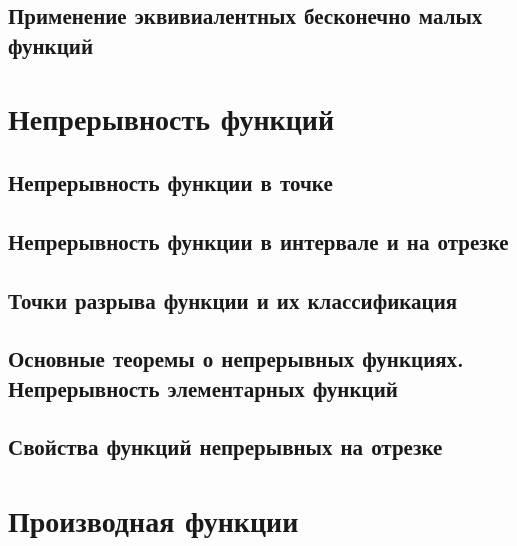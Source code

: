 \documentclass[14pt]{extreport}
\begin{document}
\section{Применение эквивиалентных бесконечно малых функций}



\chapter{Непрерывность функций}

\section{Непрерывность функции в точке}

\section{Непрерывность функции в интервале и на отрезке}

\section{Точки разрыва функции и их классификация}

\section{Основные теоремы о непрерывных функциях. Непрерывность элементарных функций}

\section{Свойства функций непрерывных на отрезке}



\chapter{Производная функции}
\end{document}
